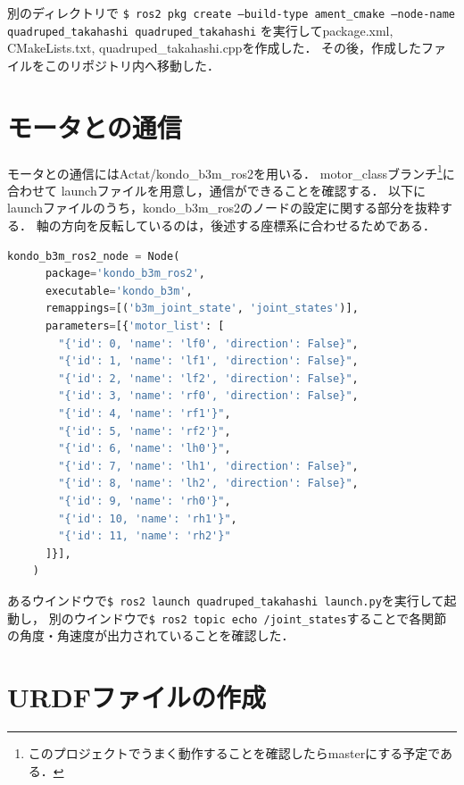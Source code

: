 \documentclass[a4paper]{jlreq}
\begin{document}
  別のディレクトリで
  \texttt{\$ ros2 pkg create --build-type ament\_cmake --node-name quadruped\_takahashi quadruped\_takahashi}
  を実行してpackage.xml, CMakeLists.txt, quadruped\_takahashi.cppを作成した．
  その後，作成したファイルをこのリポジトリ内へ移動した．

  \section{モータとの通信}

  モータとの通信にはActat/kondo\_b3m\_ros2を用いる．
  motor\_classブランチ\footnote{このプロジェクトでうまく動作することを確認したらmasterにする予定である．}に合わせて
  launchファイルを用意し，通信ができることを確認する．
  以下にlaunchファイルのうち，kondo\_b3m\_ros2のノードの設定に関する部分を抜粋する．
  軸の方向を反転しているのは，後述する座標系に合わせるためである．

  \begin{lstlisting}[basicstyle=\ttfamily, language=Python]
    kondo_b3m_ros2_node = Node(
      package='kondo_b3m_ros2',
      executable='kondo_b3m',
      remappings=[('b3m_joint_state', 'joint_states')],
      parameters=[{'motor_list': [
        "{'id': 0, 'name': 'lf0', 'direction': False}",
        "{'id': 1, 'name': 'lf1', 'direction': False}",
        "{'id': 2, 'name': 'lf2', 'direction': False}",
        "{'id': 3, 'name': 'rf0', 'direction': False}",
        "{'id': 4, 'name': 'rf1'}",
        "{'id': 5, 'name': 'rf2'}",
        "{'id': 6, 'name': 'lh0'}",
        "{'id': 7, 'name': 'lh1', 'direction': False}",
        "{'id': 8, 'name': 'lh2', 'direction': False}",
        "{'id': 9, 'name': 'rh0'}",
        "{'id': 10, 'name': 'rh1'}",
        "{'id': 11, 'name': 'rh2'}"
      ]}],
    )
  \end{lstlisting}

  あるウインドウで\texttt{\$ ros2 launch quadruped\_takahashi launch.py}を実行して起動し，
  別のウインドウで\texttt{\$ ros2 topic echo /joint\_states}することで各関節の角度・角速度が出力されていることを確認した．

  \section{URDFファイルの作成}
\end{document}
